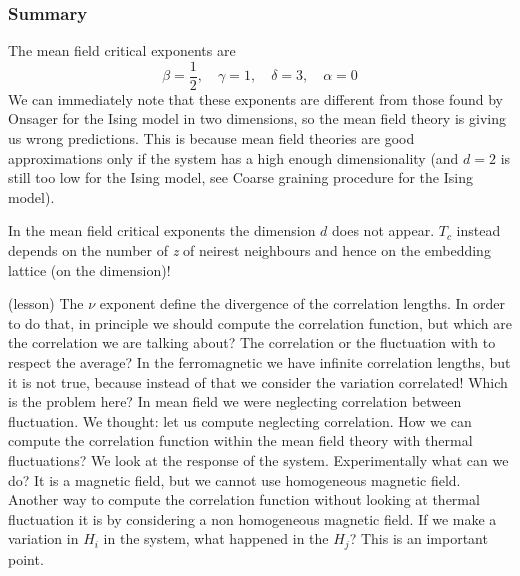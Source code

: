 \documentclass[../../Main/Main.tex]{subfiles}
\begin{document}
\subsubsection{Summary}
The mean field critical exponents are
\begin{equation}
  \beta = \frac{1}{2}, \quad \gamma =1, \quad \delta =3, \quad \alpha =0
\end{equation}
We can immediately note that these exponents are different from those found by Onsager for the Ising model in two dimensions, so the mean field theory is giving us wrong predictions. This is because mean field theories are good approximations only if the system has a high enough dimensionality (and \(d=2\) is still too low for the Ising model, see Coarse graining procedure for the Ising model).
\begin{remark}
In the mean field critical exponents the dimension \( d \) does not appear. \( T_c \) instead depends on the number of \emph{z} of neirest neighbours and hence on the embedding lattice (on the dimension)!
\end{remark}
\begin{remark}
  (lesson)
  The \( \nu  \) exponent define the divergence of the correlation lengths. In order to do that, in principle we should compute the correlation function, but which are the correlation we are talking about? The correlation or the fluctuation with to respect the average? In the ferromagnetic we have infinite correlation lengths, but it is not true, because instead of that we consider the variation correlated!
  Which is the problem here? In mean field we were neglecting correlation between fluctuation.
  We thought: let us compute neglecting correlation.
  How we can compute the correlation function within the mean field theory with thermal fluctuations? We look at the response of the system. Experimentally what can we do? It is a magnetic field, but we cannot use homogeneous magnetic field. Another way to compute the correlation function without looking at thermal fluctuation it is by considering a non homogeneous magnetic field.
  If we make a variation in \( H_i \) in the system, what happened in the \( H_j \)? This is an important point.
\end{remark}
\end{document}
